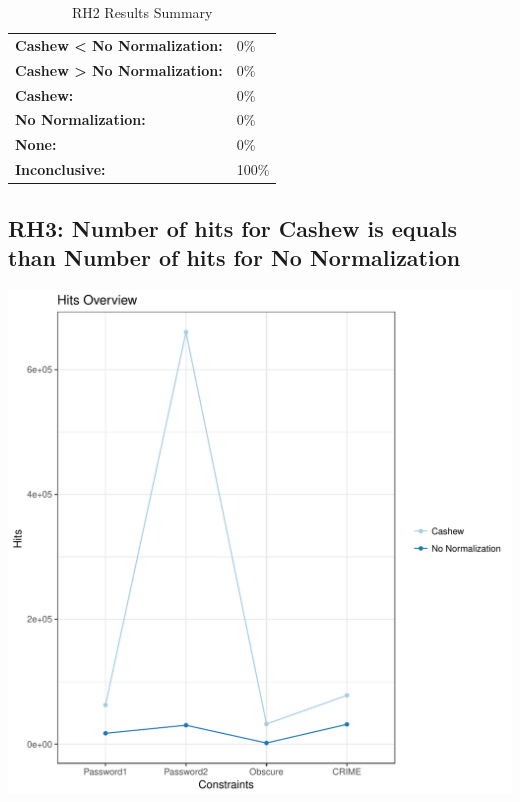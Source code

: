 \documentclass{article}\usepackage[]{graphicx}\usepackage[]{color}
\makeatletter
\def\maxwidth{ %
  \ifdim\Gin@nat@width>\linewidth
    \linewidth
  \else
    \Gin@nat@width
  \fi
}
\newenvironment{knitrout}{}{} %
\makeatother
\begin{document}
	\begin{table}[H]
	\centering
	\caption{RH2 Results Summary}
	\begin{tabular}{ll}
	\textbf{Cashew \textless{} No Normalization:}& 0\% \\
	\textbf{Cashew \textgreater{} No Normalization:}& 0\%\\
	\textbf{Cashew:} & 0\%\\
	\textbf{No Normalization:} & 0\%\\
	\textbf{None:}& 0\%\\
	\textbf{Inconclusive:}& 100\%
			
	
	\end{tabular}
	\end{table}
	
	
	



\subsection{RH3: Number of hits for Cashew is equals than Number of hits for No Normalization}


 
\begin{knitrout}
\color{fgcolor}
\includegraphics[width=\maxwidth]{figure/overview_RH3-1} 

\end{knitrout}
 	
\end{document}
